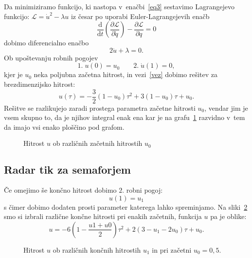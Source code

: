 \documentclass[a4paper,pdftex,12pt]{article} %
\numberwithin{equation}{section} %
\numberwithin{figure}{section} %
\numberwithin{table}{section} %
\begin{document}
Da minimiziramo funkcijo, ki nastopa v~enačbi~\ref{eq3} sestavimo Lagrangejevo funkcijo: 
$\mathcal{L} = \dot u^2 - \lambda u$ iz česar po uporabi Euler-Lagrangejevih enačb
\begin{equation}\label{EL}
    \frac{\mathrm{d}}{\mathrm{d}t} \left( \frac{\partial \mathcal{L} }{\partial \dot q} 
    \right) - \frac{\partial \mathcal{L}}{\partial q} = 0
\end{equation}
dobimo diferencialno enačbo
\begin{equation}
    2 \ddot u + \lambda = 0.
\end{equation}
Ob upoštevanju robnih pogojev
\begin{equation}
    1. \; u(0) = u_0 \qquad 2. \; \dot u(1) = 0,
\end{equation}
kjer je $u_0$ neka poljubna začetna hitrost, in vezi~\ref{vez} dobimo rešitev za 
brezdimenzijsko hitrost:
\begin{equation}\label{osnovna}
    u(\tau) = - \frac{3}{2} \left( 1- u_0 \right) \tau^2 + 3 (1-u_0) \tau + u_0.
\end{equation}
Rešitve se razlikujejo zaradi prostega parametra začetne hitrosti $u_0$, vendar jim je 
vsem skupno to, da je njihov integral enak ena kar je na grafu~\ref{slika1} razvidno v~tem
da imajo vsi enako ploščino pod grafom.
\begin{figure}    
    
    \caption{Hitrost $u$ ob različnih začetnih hitrostih $u_0$}
    \label{slika1}
\end{figure}
\subsection{Radar tik za semaforjem}
Če omejimo še končno hitrost dobimo $2.$ robni pogoj:
\begin{equation}
    u(1)= u_1
\end{equation}
s čimer dobimo dodaten prosti parameter katerega lahko spreminjamo. Na sliki~\ref{slika2}
smo si izbrali različne končne hitrosti pri enakih začetnih, funkcija $u$ pa je oblike:
\begin{equation}\label{robni}
    u = -6 \left(1- \frac{u1+u0}{2} \right) \tau^2 + 2 (3-u_1-2u_0) \tau + u_0.
\end{equation}

\begin{figure}    
    
    \caption{Hitrost $u$ ob različnih končnih hitrostih $u_1$ in pri začetni $u_0=0,5$.}
    \label{slika2}
\end{figure}
\end{document}
